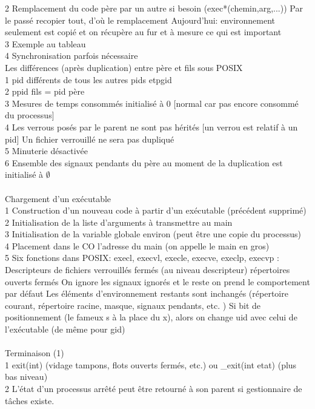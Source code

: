 \documentclass[5pt]{article}
\begin{document}
\begin{scriptsize}
2 Remplacement du code père par un autre si besoin (exec*(chemin,arg,...)) Par le passé recopier tout, d’où le remplacement Aujourd’hui: environnement seulement est copié et on récupère au fur et à mesure ce qui est important\\
3 Exemple au tableau\\
4 Synchronisation parfois nécessaire\\
Les différences (après duplication) entre père et fils sous POSIX\\
1 pid différents de tous les autres pids etpgid \\
2 ppid fils = pid père\\
3 Mesures de temps consommés initialisé à 0 [normal car pas encore consommé du processus]\\
4 Les verrous posés par le parent ne sont pas hérités [un verrou est relatif à un pid] Un fichier verrouillé ne sera pas dupliqué\\
5 Minuterie désactivée\\
6 Ensemble des signaux pendants du père au moment de la duplication est initialisé à $\emptyset$\\
\\
Chargement d’un exécutable\\
1 Construction d’un nouveau code à partir d’un exécutable (précédent supprimé)\\
2 Initialisation de la liste d’arguments à transmettre au main\\
3 Initialisation de la variable globale environ (peut être une copie du processus)\\
4 Placement dans le CO l’adresse du main (on appelle le main en gros)\\
5 Six fonctions dans POSIX: execl, execvl, execle, execve, execlp, execvp : Descripteurs de fichiers verrouillés fermés (au niveau descripteur) répertoires ouverts fermés On ignore les signaux ignorés et le reste on prend le comportement par défaut Les éléments d’environnement restants sont inchangés (répertoire courant, répertoire racine, masque, signaux pendants, etc. ) Si bit de positionnement (le fameux s à la place du x), alors on change uid avec celui de l’exécutable (de même pour gid)\\
\\
Terminaison (1)\\
1 exit(int) (vidage tampons, flots ouverts fermés, etc.) ou \_exit(int etat) (plus bas niveau)\\
2 L’état d’un processus arrêté peut être retourné à son parent si gestionnaire de tâches existe.\\

\end{scriptsize}
\end{document}
